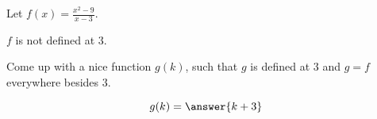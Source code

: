 \documentclass{ximera}
\author{Lee Wayand}
\begin{document}
\begin{exercise}



\begin{question}




Let  $f(x) = \frac{x^2 - 9}{x - 3}$.


$f$ is not defined at $3$.


Come up with a nice function $g(k)$, such that $g$ is defined at $3$ and $g = f$ everywhere besides $3$.



\[
g(k) = \answer{k+3}
\]







\end{question}












\end{exercise}
\end{document}
